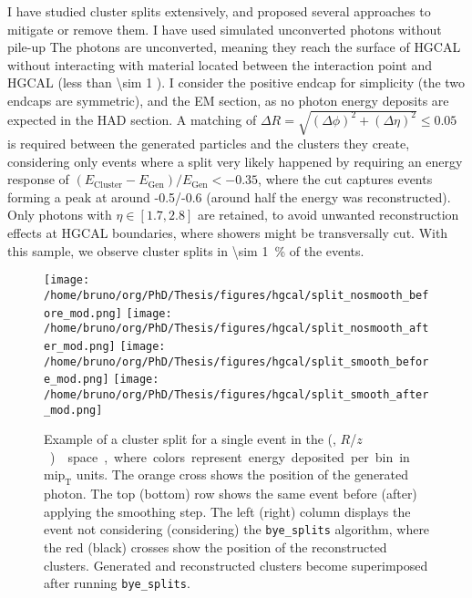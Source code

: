 \documentclass[11pt]{article}
\newcommand{\bsplits}{\texttt{bye\_splits}}
\newcommand{\coordsa}{(\si{\azi}, \si{\rz})}
\newcommand{\rz}{$R$/$z$}
\newcommand{\tmip}{$\text{mip}_{\text{T}}$}
\begin{document}
I have studied cluster splits extensively, and proposed several approaches to mitigate or remove them.
I have used simulated unconverted photons without pile-up
The photons are unconverted, meaning they reach the surface of \ac{HGCAL} without interacting with material located between the interaction point and \ac{HGCAL} (less than \SI{\sim 1}{\radl} \cite{hgcal_web}).
I consider the positive endcap for simplicity (the two endcaps are symmetric), and the \ac{EM} section, as no photon energy deposits are expected in the \ac{HAD} section.
A matching of \(\Delta R = \sqrt{(\Delta \phi)^{2} + (\Delta \eta)^{2}} \leq 0.05\) is required between the generated particles and the clusters they create, considering only events where a split very likely happened by requiring an energy response of \((E_{\text{Cluster}}-E_{\text{Gen}})/E_{\text{Gen}} < -0.35\), where the cut captures events forming a peak at around -0.5/-0.6 (around half the energy was reconstructed).
Only photons with \(\eta \in \left[1.7, 2.8\right]\) are retained, to avoid unwanted reconstruction effects at \ac{HGCAL} boundaries, where showers might be transversally cut.
With this sample, we observe cluster splits in \SI{\sim 1}{\percent} of the events.

\begin{figure}
\texttt{[image: /home/bruno/org/PhD/Thesis/figures/hgcal/split\_nosmooth\_before\_mod.png]}
\texttt{[image: /home/bruno/org/PhD/Thesis/figures/hgcal/split\_nosmooth\_after\_mod.png]}
\texttt{[image: /home/bruno/org/PhD/Thesis/figures/hgcal/split\_smooth\_before\_mod.png]}
\texttt{[image: /home/bruno/org/PhD/Thesis/figures/hgcal/split\_smooth\_after\_mod.png]}
\caption{\label{fig:split}Example of a cluster split for a single event in the \coordsa{} space, where colors represent energy deposited per bin in \tmip{} units. The orange cross shows the position of the generated photon. The top (bottom) row shows the same event before (after) applying the smoothing step. The left (right) column displays the event not considering (considering) the \bsplits{} algorithm, where the red (black) crosses show the position of the reconstructed clusters. Generated and reconstructed clusters become superimposed after running \bsplits{}.}
\end{figure}
\end{document}
